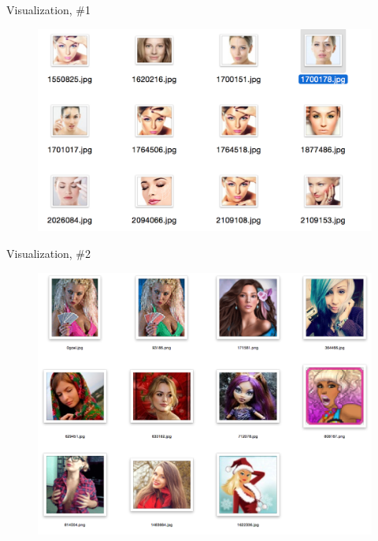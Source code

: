 \documentclass{beamer}
\begin{document}
\begin{frame}{Visualization, \#1}

\begin{figure}[h!]
  \centering
  \includegraphics[width=1\textwidth]{images/search1.png}
\end{figure}

\end{frame}


\begin{frame}{Visualization, \#2}

\begin{figure}[h!]
  \centering
  \includegraphics[width=1\textwidth]{images/search2.png}
\end{figure}

\end{frame}
\end{document}
